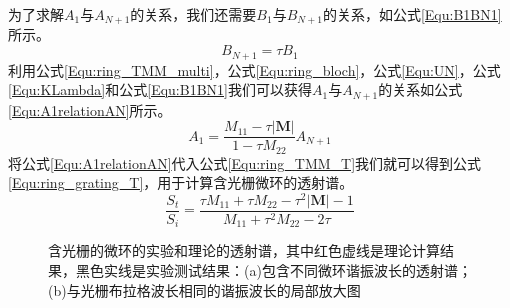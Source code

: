 为了求解$A_1$与$A_{N+1}$的关系，我们还需要$B_{1}$与$B_{N+1}$的关系，如公式\ref{Equ:B1BN1}所示。
\begin{equation}
\label{Equ:B1BN1}
B_{N+1} = \tau B_1 
\end{equation}
利用公式\ref{Equ:ring_TMM_multi}，公式\ref{Equ:ring_bloch}，公式\ref{Equ:UN}，公式\ref{Equ:KLambda}和公式\ref{Equ:B1BN1}我们可以获得$A_1$与$A_{N+1}$的关系如公式\ref{Equ:A1relationAN}所示。
\begin{equation}
\label{Equ:A1relationAN}
A_1 = \frac{M_{11}-\tau |\textbf{M}|}{1-\tau M_{22}}A_{N+1}
\end{equation}
将公式\ref{Equ:A1relationAN}代入公式\ref{Equ:ring_TMM_T}我们就可以得到公式\ref{Equ:ring_grating_T}，用于计算含光栅微环的透射谱。
\begin{equation}
\label{Equ:ring_grating_T}
\frac{S_t}{S_i}=\frac{\tau M_{11} + \tau M_{22} - \tau^2|\textbf{M}|-1}{M_{11}+\tau^2 M_{22}-2\tau}
\end{equation}
\begin{figure}[htb]
	\small
	\caption{含光栅的微环的实验和理论的透射谱，其中红色虚线是理论计算结果，黑色实线是实验测试结果：(a)包含不同微环谐振波长的透射谱；(b)与光栅布拉格波长相同的谐振波长的局部放大图}
	\label{chapt5_grating_ring_single}	
\end{figure}

